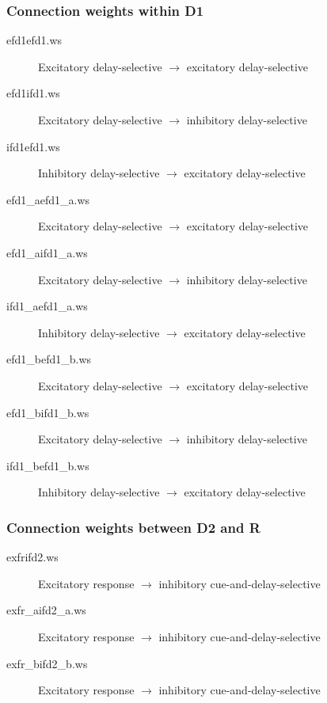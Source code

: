 \documentclass[12pt]{article}
\begin{document}
\subsubsection{Connection weights within D1}
\begin{description}
  \item[efd1efd1.ws] Excitatory delay-selective $\rightarrow$
                     excitatory delay-selective
  \item[efd1ifd1.ws] Excitatory delay-selective $\rightarrow$
                     inhibitory delay-selective  
  \item[ifd1efd1.ws] Inhibitory delay-selective $\rightarrow$
                     excitatory delay-selective
  \item[efd1\_aefd1\_a.ws] Excitatory delay-selective $\rightarrow$
                     excitatory delay-selective
  \item[efd1\_aifd1\_a.ws] Excitatory delay-selective $\rightarrow$
                     inhibitory delay-selective  
  \item[ifd1\_aefd1\_a.ws] Inhibitory delay-selective $\rightarrow$
                     excitatory delay-selective
  \item[efd1\_befd1\_b.ws] Excitatory delay-selective $\rightarrow$
                     excitatory delay-selective
  \item[efd1\_bifd1\_b.ws] Excitatory delay-selective $\rightarrow$
                     inhibitory delay-selective  
  \item[ifd1\_befd1\_b.ws] Inhibitory delay-selective $\rightarrow$
                     excitatory delay-selective
\end{description}

\subsubsection{Connection weights between D2 and R}
\begin{description}
  \item[exfrifd2.ws] Excitatory response $\rightarrow$
                     inhibitory cue-and-delay-selective
  \item[exfr\_aifd2\_a.ws] Excitatory response $\rightarrow$
                     inhibitory cue-and-delay-selective
  \item[exfr\_bifd2\_b.ws] Excitatory response $\rightarrow$
                     inhibitory cue-and-delay-selective
\end{description}
\end{document}
